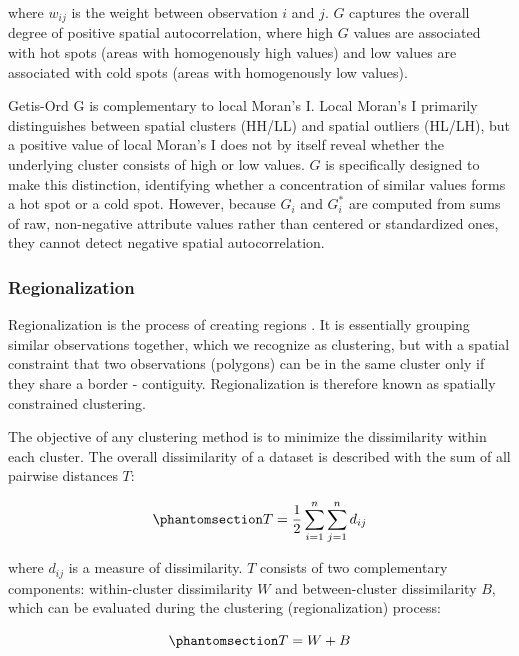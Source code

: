 \documentclass[
  english,
  12pt,
  a4paper,
]{article}
\begin{document}
where \(w_{ij}\) is the weight between observation \(i\) and \(j\).
\(G\) captures the overall degree of positive spatial autocorrelation,
where high \(G\) values are associated with hot spots (areas with
homogenously high values) and low values are associated with cold spots
(areas with homogenously low values).

Getis-Ord G is complementary to local Moran's I. Local Moran's I
primarily distinguishes between spatial clusters (HH/LL) and spatial
outliers (HL/LH), but a positive value of local Moran's I does not by
itself reveal whether the underlying cluster consists of high or low
values. \(G\) is specifically designed to make this distinction,
identifying whether a concentration of similar values forms a hot spot
or a cold spot. However, because \(G_i\) and \(G_i^*\)\hspace{0pt} are
computed from sums of raw, non-negative attribute values rather than
centered or standardized ones, they cannot detect negative spatial
autocorrelation.

\subsubsection{Regionalization}\label{regionalization}

Regionalization is the process of creating regions \citep{duque2007}. It
is essentially grouping similar observations together, which we
recognize as clustering, but with a spatial constraint that two
observations (polygons) can be in the same cluster only if they share a
border - contiguity. Regionalization is therefore known as spatially
constrained clustering.

The objective of any clustering method is to minimize the dissimilarity
within each cluster. The overall dissimilarity of a dataset is described
with the sum of all pairwise distances \(T\):

\begin{equation}\phantomsection\label{eq-reg_pairwise_dist}{T = \frac{1}{2} \sum_{i=1}^{n} \sum_{j=1}^{n} d_{ij}}\end{equation}

where \(d_{ij}\) is a measure of dissimilarity. \(T\) consists of two
complementary components: within-cluster dissimilarity \(W\) and
between-cluster dissimilarity \(B\), which can be evaluated during the
clustering (regionalization) process:

\begin{equation}\phantomsection\label{eq-sum_wb}{T=W+B}\end{equation}
\end{document}
